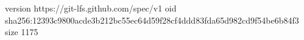 version https://git-lfs.github.com/spec/v1
oid sha256:12393c9800acde3b212bc55ec64d59f28cf4ddd83fda65d982cd9f54be6b84f3
size 1175
